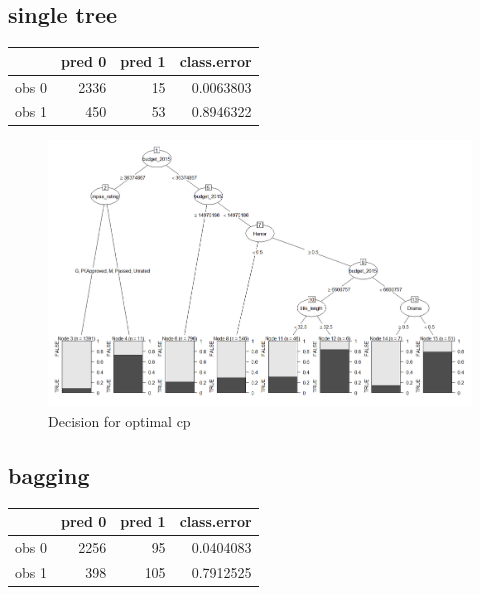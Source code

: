 \documentclass[
]{article}
\begin{document}
\hypertarget{single-tree}{%
\subsection{single tree}\label{single-tree}}

\begin{longtable}[]{@{}lrrr@{}}
\toprule
& pred 0 & pred 1 & class.error\tabularnewline
\midrule
\endhead
obs 0 & 2336 & 15 & 0.0063803\tabularnewline
obs 1 & 450 & 53 & 0.8946322\tabularnewline
\bottomrule
\end{longtable}

\begin{figure}[h]

{\centering \includegraphics{./bigtree} 

}

\caption{Decision for optimal cp}\label{fig:unnamed-chunk-8}
\end{figure}

\hypertarget{bagging}{%
\subsection{bagging}\label{bagging}}

\begin{longtable}[]{@{}lrrr@{}}
\toprule
& pred 0 & pred 1 & class.error\tabularnewline
\midrule
\endhead
obs 0 & 2256 & 95 & 0.0404083\tabularnewline
obs 1 & 398 & 105 & 0.7912525\tabularnewline
\bottomrule
\end{longtable}
\end{document}
